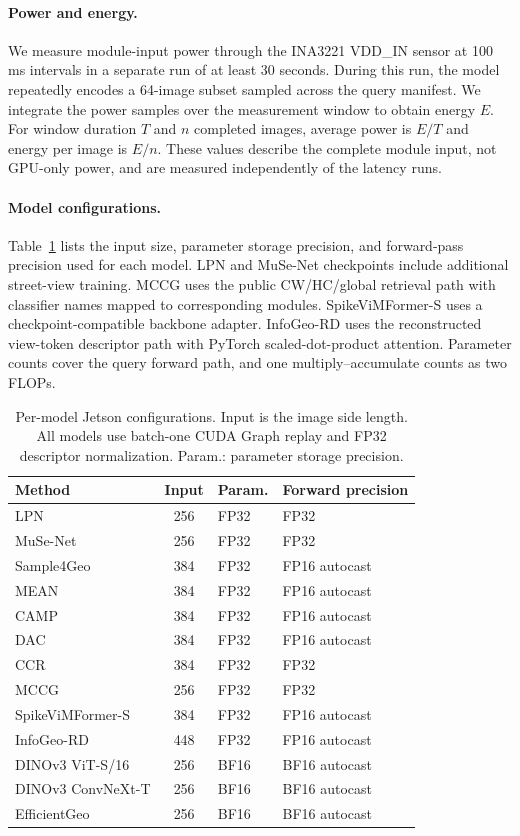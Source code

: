 \paragraph{Power and energy.}
We measure module-input power through the INA3221 VDD\_IN sensor at 100\,ms intervals in a separate run of at least 30 seconds. During this run, the model repeatedly encodes a 64-image subset sampled across the query manifest. We integrate the power samples over the measurement window to obtain energy $E$. For window duration $T$ and $n$ completed images, average power is $E/T$ and energy per image is $E/n$. These values describe the complete module input, not GPU-only power, and are measured independently of the latency runs.

\paragraph{Model configurations.}
Table~\ref{tab:supp-runtime} lists the input size, parameter storage precision, and forward-pass precision used for each model. LPN and MuSe-Net checkpoints include additional street-view training. MCCG uses the public CW/HC/global retrieval path with classifier names mapped to corresponding modules. SpikeViMFormer-S uses a checkpoint-compatible backbone adapter. InfoGeo-RD uses the reconstructed view-token descriptor path with PyTorch scaled-dot-product attention. Parameter counts cover the query forward path, and one multiply--accumulate counts as two FLOPs.

\begin{table}[t]
\begingroup
\centering
\caption{Per-model Jetson configurations. Input is the image side length. All models use batch-one CUDA Graph replay and FP32 descriptor normalization. Param.: parameter storage precision.}
\label{tab:supp-runtime}
{\footnotesize\setlength{\tabcolsep}{3pt}
\begin{tabular*}{\columnwidth}{@{\extracolsep{\fill}}lcll@{}}
\toprule
Method & Input & Param. & Forward precision \\
\midrule
LPN & 256 & FP32 & FP32 \\
MuSe-Net & 256 & FP32 & FP32 \\
Sample4Geo & 384 & FP32 & FP16 autocast \\
MEAN & 384 & FP32 & FP16 autocast \\
CAMP & 384 & FP32 & FP16 autocast \\
DAC & 384 & FP32 & FP16 autocast \\
CCR & 384 & FP32 & FP32 \\
MCCG & 256 & FP32 & FP32 \\
SpikeViMFormer-S & 384 & FP32 & FP16 autocast \\
InfoGeo-RD & 448 & FP32 & FP16 autocast \\
DINOv3 ViT-S/16 & 256 & BF16 & BF16 autocast \\
DINOv3 ConvNeXt-T & 256 & BF16 & BF16 autocast \\
EfficientGeo & 256 & BF16 & BF16 autocast \\

\bottomrule
\end{tabular*}}
\endgroup
\end{table}

